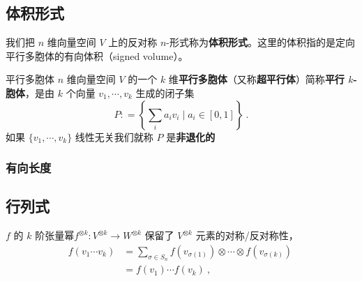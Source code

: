 
\begin{issues}
\issueDraft
\end{issues}


\subsection{体积形式}




我们把 $n$ 维向量空间 $V$ 上的反对称 $n$-形式称为\textbf{体积形式}。这里的体积指的是定向平行多胞体的有向体积（signed volume）。

\begin{definition}{平行多胞体}
$n$ 维向量空间 $V$ 的一个 $k$ 维\textbf{平行多胞体}（又称\textbf{超平行体}）简称\textbf{平行 $k$-胞体}，是由 $k$ 个向量 $v_1, \cdots, v_k$ 生成的闭子集
\begin{equation}
P: = \left\{ \sum_i a_i v_i \mid a_i \in [0, 1] \right\}~.
\end{equation}
如果 $\{v_1, \cdots, v_k\}$ 线性无关我们就称 $P$ 是\textbf{非退化的}
\end{definition}


\subsubsection{有向长度}

\subsection{行列式}

$f$ 的 $k$ 阶张量幂$f^{\otimes k}: V^{\otimes k} \to W^{\otimes k}$ 保留了 $V^{\otimes k}$ 元素的对称/反对称性，
\begin{equation}
\begin{aligned}
f(v_1 \cdots v_k) &= \sum_{\sigma \in S_n} f(v_{\sigma(1)}) \otimes \cdots \otimes f(v_{\sigma(k)}) \\
&= f(v_1) \cdots f(v_k)~,
\end{aligned}~
\end{equation}


